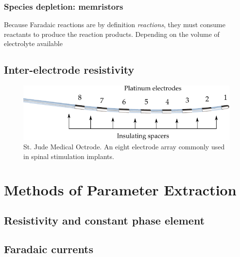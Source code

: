     \subsubsection{Species depletion: memristors}
      Because Faradaic reactions are by definition \emph{reactions}, they must consume reactants to produce the reaction products.
      Depending on the volume of electrolyte available


  \subsection{Inter-electrode resistivity}
    \begin{figure}
      \centering
      \includegraphics{content/pt2/07-InterfaceModel/graphics/StJudeOctrodeDiagram}
      \caption{\label{fig:StJudeOctrode_Labelled}St. Jude Medical Octrode. An eight electrode array commonly used in spinal stimulation implants.}
    \end{figure}




\section{Methods of Parameter Extraction}
  \subsection{Resistivity and constant phase element}
  \subsection{Faradaic currents}

